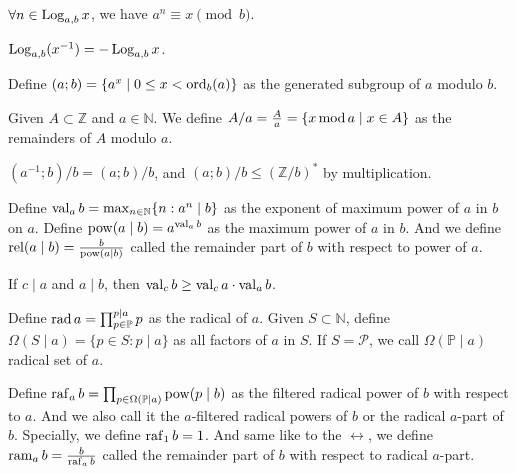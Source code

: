 \begin{proposition}
    $\forall n\in \operatorname{Log}_{a,b}x$, we have $a^{n} \equiv x \pmod{b}$.
\end{proposition}
\begin{proposition}
    $\operatorname{Log}_{a,b}(x^{-1}) = -\operatorname{Log}_{a,b}x$.
\end{proposition}
\begin{definition}\label{def:generated-subgroup}
    Define $(a;b) = \{ a^{x} \mid 0 \le x < \operatorname{ord}_{b}(a) \}$ as the generated subgroup of $a$ modulo $b$.
\end{definition}
\begin{definition}
    Given $A\subset \mathbb{Z}$ and $a\in \mathbb{N}$. We define $A/a = \frac{A}{a} = \{ x\operatorname{mod} a\mid x\in A \}$ as the remainders of $A$ modulo $a$.
\end{definition}
\begin{proposition}
    $(a^{-1};b)/b = (a;b)/b$, and $(a;b)/b \le (\mathbb{Z}/b)^{*}$ by multiplication.
\end{proposition}
\begin{definition}\label{def:power-and-power-count}Define $\operatorname{val}_{a}b = \max_{n \in \mathbb{N}}\{n: a^n \mid b\}$ as the exponent of maximum power of $a$ in $b$ on $a$.
    Define $\operatorname{pow}(a\mid b) = a^{\operatorname{val}_{a}b}$ as the maximum power of $a$ in $b$. 
    And we define $\operatorname{rel}(a\mid b) = \frac{b}{\operatorname{pow}(a\mid b)}$ called the remainder part of $b$ with respect to power of $a$.
\end{definition}
\begin{proposition}
    If $c \mid a$ and $a \mid b$, then $\operatorname{val}_{c}b \ge \operatorname{val}_{c}a \cdot \operatorname{val}_{a}b$.
\end{proposition}
\begin{definition}\label{def:radical}
    Define $\operatorname{rad} a = \prod_{p \in \mathbb{P}}^{p \mid a}p$ as the radical of $a$. Given $S\subset\mathbb{N}$, define $\Omega(S\mid a) = \{p \in S: p \mid a\}$ as all factors of $a$ in $S$. If $S = \mathcal{P}$, we call $\Omega(\mathbb{P}\mid a)$ radical set of $a$.
\end{definition}
\begin{definition}\label{def:filtered-radical-powers}
    Define $\operatorname{raf}_{a}b = \prod_{p \in \Omega(\mathbb{P}\mid a)}\operatorname{pow}(p\mid b)$ as the filtered radical power of $b$ with respect to $a$. And we also call it the $a$-filtered radical powers of $b$ or the radical $a$-part of $b$. Specially, we define $\operatorname{raf}_{1}b = 1$.
    And same like to the $\rel$,  we define $\operatorname{ram}_{a}b = \frac{b}{\operatorname{raf}_{a}b}$ called the remainder part of $b$ with respect to radical $a$-part.
\end{definition}
